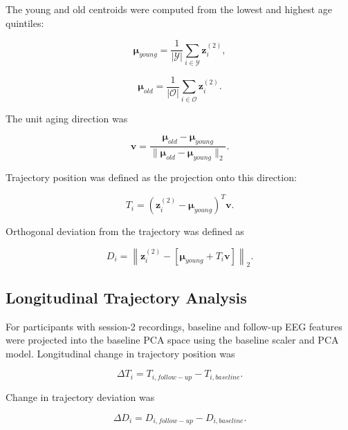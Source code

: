 \documentclass[journal]{IEEEtran}
\begin{document}
The young and old centroids were computed from the lowest and highest age quintiles:

\begin{equation}
\boldsymbol{\mu}_{young} =
\frac{1}{|\mathcal{Y}|}\sum_{i\in\mathcal{Y}}\mathbf{z}_i^{(2)},
\end{equation}

\begin{equation}
\boldsymbol{\mu}_{old} =
\frac{1}{|\mathcal{O}|}\sum_{i\in\mathcal{O}}\mathbf{z}_i^{(2)}.
\end{equation}

The unit aging direction was

\begin{equation}
\mathbf{v} =
\frac{\boldsymbol{\mu}_{old}-\boldsymbol{\mu}_{young}}
{\|\boldsymbol{\mu}_{old}-\boldsymbol{\mu}_{young}\|_2}.
\end{equation}

Trajectory position was defined as the projection onto this direction:

\begin{equation}
T_i = (\mathbf{z}_i^{(2)}-\boldsymbol{\mu}_{young})^{T}\mathbf{v}.
\end{equation}

Orthogonal deviation from the trajectory was defined as

\begin{equation}
D_i =
\left\|
\mathbf{z}_i^{(2)}
-
\left[
\boldsymbol{\mu}_{young}+T_i\mathbf{v}
\right]
\right\|_2.
\end{equation}

\subsection{Longitudinal Trajectory Analysis}

For participants with session-2 recordings, baseline and follow-up EEG features were projected into the baseline PCA space using the baseline scaler and PCA model. Longitudinal change in trajectory position was

\begin{equation}
\Delta T_i = T_{i,follow-up} - T_{i,baseline}.
\end{equation}

Change in trajectory deviation was

\begin{equation}
\Delta D_i = D_{i,follow-up} - D_{i,baseline}.
\end{equation}
\end{document}
